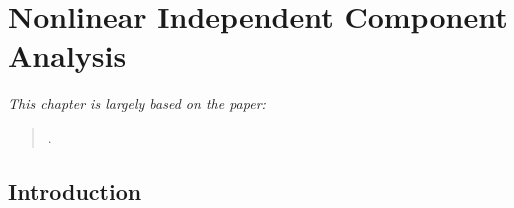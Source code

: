 
\newcommand\independent{\protect\mathpalette{\protect\independenT}{\perp}}
\def\independenT#1#2{\mathrel{\rlap{$#1#2$}\mkern2mu{#1#2}}}


\chapter{Nonlinear Independent Component Analysis}

\ifpdf
    \graphicspath{{Chapter4/Figs/Raster/}{Chapter4/Figs/PDF/}{Chapter4/Figs/}}
\else
    \graphicspath{{Chapter4/Figs/Vector/}{Chapter4/Figs/}}
\fi

\emph{This chapter is largely based on the paper:}

\begin{quote}
	.
\end{quote}



\section{Introduction}


